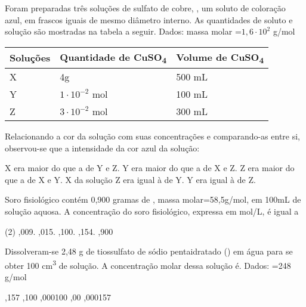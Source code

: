 \documentclass[11pt]{scrartcl}
\begin{document}
\begin{exercise}[points=1.0]
Foram preparadas três soluções de sulfato de cobre, , um soluto de coloração azul, em frascos iguais de mesmo diâmetro interno. As quantidades de soluto e solução são mostradas na tabela a seguir. Dados: massa molar  =\(1,6 \cdot 10^2\) g/mol

\begin{center}
\begin{tabular}{lll}
\hline
Soluções & Quantidade de CuSO\textsubscript{4} & Volume de CuSO\textsubscript{4}\\[0pt]
\hline
X & 4g & 500 mL\\[0pt]
Y & \(1\cdot 10^{-2}\) mol & 100 mL\\[0pt]
Z & \(3\cdot 10^{-2}\) mol & 300 mL\\[0pt]
\hline
\end{tabular}
\end{center}


Relacionando a cor da solução com suas concentrações e comparando-as entre si, observou-se que a
intensidade da cor azul da solução:

\begin{choice}
\choice X era maior do que a de Y e Z.
\choice Y era maior do que a de X e Z.
\choice Z era maior do que a de X e Y.
\choice X da solução Z era igual à de Y.
\choice Y era igual à de Z.
\end{choice}
\end{exercise}

\begin{exercise}[points=1.0]
Soro fisiológico contém 0,900 gramas de , massa molar=58,5g/mol, em 100mL de solução
aquosa. A concentração do soro fisiológico, expressa em mol/L, é igual a


\begin{choice}(2)
,009.
,015.
,100.
,154.
,900
\end{choice}
\end{exercise}


\begin{exercise}[points=1.0]
Dissolveram-se 2,48 g de tiossulfato de sódio pentaidratado () em água para se
obter 100 cm\textsuperscript{3} de solução. A concentração molar dessa solução é. Dados: =248 g/mol

\begin{choice}
,157
,100
,000100
,00
,000157
\end{choice}
\end{exercise}
\end{document}
